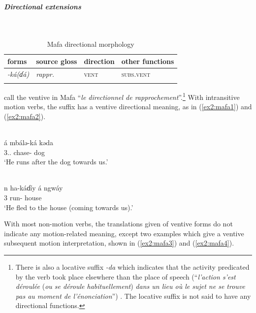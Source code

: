 \subparagraph{Directional extensions}~


\begin{table}[H]
\caption{Mafa directional morphology}
\label{tab:mafa}
\begin{tabular}{llll} %
	\lsptoprule
	forms & source gloss & direction  & other functions  \\ %
	\midrule
	\textit{-ká(ɗá)}  &  \textit{rappr.} &  \textsc{vent} &  \textsc{subs.vent}  \\
	\lspbottomrule
\end{tabular}
\end{table} 

\citet[45]{barreteauLexiqueMafaLangue1990} call the ventive in Mafa ``\textit{le directionnel de rapprochement}''.\footnote{There is also a locative suffix \textit{-da} which indicates that the activity predicated by the verb took place elsewhere than the place of speech (``\textit{l'action s'est déroulée} (\textit{ou se déroule habituellement}) \textit{dans un lieu où le sujet ne se trouve pas au moment de l'énonciation}'') \citep[45]{barreteauLexiqueMafaLangue1990}. The locative suffix is not said to have any directional functions.} With intransitive motion verbs, the suffix has a ventive directional meaning, as in (\ref{ex2:mafa1}) and (\ref{ex2:mafa2}).

\ea\label{ex2:mafa1}
 \\
\gll á mbálə-ká kəda	 \\
3..  chase- dog \\
\glt `He runs after the dog towards us.' 

\ex\label{ex2:mafa2}
 \\
\gll n ha-káɗíy á ngwáy	\\
3 run-  house \\ 
\glt `He fled to the house (coming towards us).' 
\z 

With most non-motion verbs, the translations given of ventive forms do not indicate any motion-related meaning, except two examples which give a ventive subsequent motion interpretation, shown in (\ref{ex2:mafa3}) and (\ref{ex2:mafa4}). 

